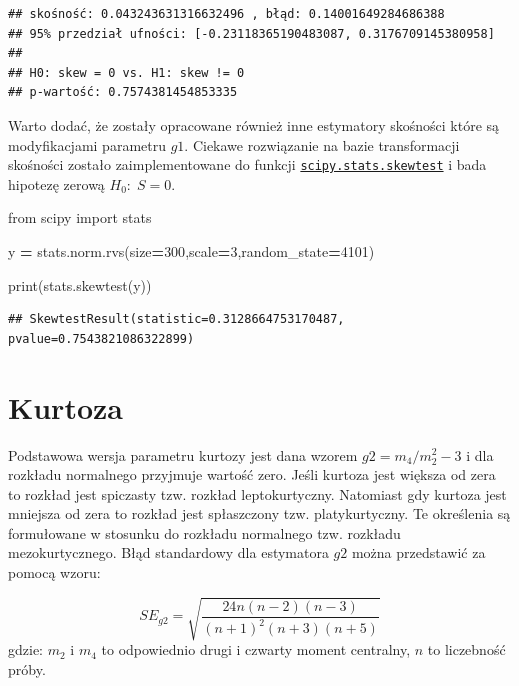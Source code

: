 \documentclass[polish,]{book}
\newenvironment{Shaded}{\begin{snugshade}}{\end{snugshade}}
\newcommand{\BuiltInTok}[1]{#1}
\newcommand{\DecValTok}[1]{\textcolor[rgb]{0.00,0.00,0.81}{#1}}
\newcommand{\ImportTok}[1]{#1}
\newcommand{\NormalTok}[1]{#1}
\newcommand{\OperatorTok}[1]{\textcolor[rgb]{0.81,0.36,0.00}{\textbf{#1}}}
\begin{document}
\begin{verbatim}
## skośność: 0.043243631316632496 , błąd: 0.14001649284686388
## 95% przedział ufności: [-0.23118365190483087, 0.3176709145380958]
## 
## H0: skew = 0 vs. H1: skew != 0
## p-wartość: 0.7574381454853335
\end{verbatim}

Warto dodać, że zostały opracowane również inne estymatory skośności \citep{kurt2011} które są modyfikacjami parametru \(g1\). Ciekawe rozwiązanie na bazie
transformacji skośności \citep{agos1970} zostało zaimplementowane do funkcji \href{https://docs.scipy.org/doc/scipy/reference/generated/scipy.stats.skewtest.html}{\texttt{scipy.stats.skewtest}} i bada hipotezę zerową \(H_0:\;S= 0\).

\begin{Shaded}
\begin{Highlighting}[]
\ImportTok{from}\NormalTok{ scipy }\ImportTok{import}\NormalTok{ stats}

\NormalTok{y }\OperatorTok{=}\NormalTok{ stats.norm.rvs(size}\OperatorTok{=}\DecValTok{300}\NormalTok{,scale}\OperatorTok{=}\DecValTok{3}\NormalTok{,random_state}\OperatorTok{=}\DecValTok{4101}\NormalTok{)}

\BuiltInTok{print}\NormalTok{(stats.skewtest(y))}
\end{Highlighting}
\end{Shaded}

\begin{verbatim}
## SkewtestResult(statistic=0.3128664753170487, pvalue=0.7543821086322899)
\end{verbatim}

\hypertarget{R77}{%
\section{Kurtoza}\label{R77}}

Podstawowa wersja parametru kurtozy jest dana wzorem \(g2=m_4/m_2^2-3\) i dla rozkładu normalnego przyjmuje wartość zero. Jeśli kurtoza jest większa od zera to rozkład jest spiczasty tzw. rozkład leptokurtyczny. Natomiast gdy kurtoza jest mniejsza od zera to rozkład jest spłaszczony tzw. platykurtyczny. Te określenia są formułowane w stosunku do rozkładu normalnego tzw. rozkładu mezokurtycznego. Błąd standardowy dla estymatora \(g2\) można przedstawić za pomocą wzoru:

\begin{equation}
SE_{g2}=\sqrt{\frac{24n(n-2)(n-3)}{(n+1)^2(n+3)(n+5)}}
\label{eq:ku01}
\end{equation}
gdzie: \(m_2\) i \(m_4\) to odpowiednio drugi i czwarty moment centralny, \(n\) to liczebność próby.
\end{document}
